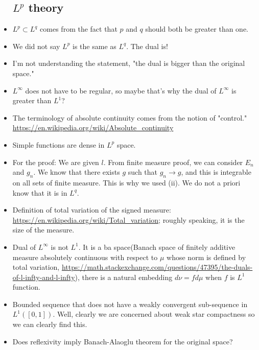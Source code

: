 \documentclass{article}
\theoremstyle{remark}
\begin{document}
\begin{itemize}
\subsection*{$L^p$ theory}
\item $L^p\subset L^q$ comes from the fact that $p$ and $q$ should both be greater than one.
\item We did not say $L^p$ is the same as $L^q$. The dual is!
\item I'm not understanding the statement, "the dual is bigger than the original space."
\item $L^\infty$ does not have to be regular, so maybe that's why the dual of $L^\infty$ is greater than $L^1$?
\item The terminology of absolute continuity comes from the notion of "control." \url{https://en.wikipedia.org/wiki/Absolute_continuity}

\item Simple functions are dense in $L^p$ space. 

\item For the proof: We are given $l$. From finite measure proof, we can consider $E_n$ and $g_n$. We know that there exists $g$ such that $g_n\to g$, and this is integrable on all sets of finite measure. This is why we used (ii). We do not a priori know that it is in $L^q$.
\item Definition of total variation of the signed measure: \url{https://en.wikipedia.org/wiki/Total_variation}; roughly speaking, it is the size of the measure.
\item Dual of $L^\infty$ is not $L^1$. It is a ba space(Banach space of finitely additive measure absolutely continuous with respect to $\mu$ whose norm is defined by total variation, \url{https://math.stackexchange.com/questions/47395/the-duals-of-l-infty-and-l-infty}), there is a natural embedding $d\nu=fd\mu$ when $f$ is $L^1$ function.
\item Bounded sequence that does not have a weakly convergent sub-sequence in $L^1([0,1])$. Well, clearly we are concerned about weak star compactness so we can clearly find this. 
\item Does reflexivity imply Banach-Alaoglu theorem for the original space?

\end{itemize}
\end{document}
